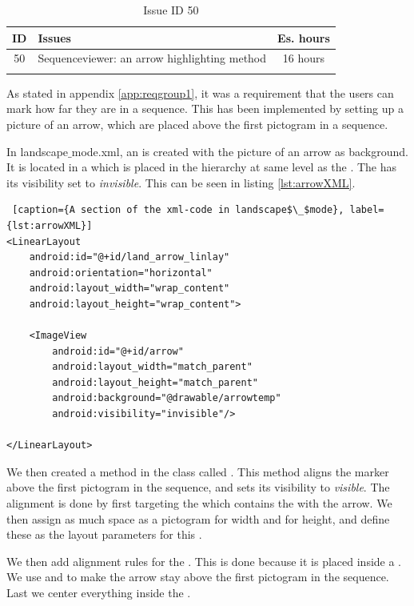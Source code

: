 \begin{longtable} { | c | p{12cm} | c | } 
\hline
	ID 	&	Issues	&		 Es. hours \\\hline
	50 	&	Sequenceviewer: an arrow highlighting method	&	16 hours \\\hline
\caption{Issue ID 50}
\label{tab:spr3_SVarrowhighlight}
\end{longtable}

As stated in appendix \ref{app:reqgroup1}, it was a requirement that the users can mark how far they are in a sequence. This has been implemented by setting up a picture of an arrow, which are placed above the first pictogram in a sequence.

In landscape$\_$mode.xml, an  is created with the picture of an arrow as background. It is located in a  which is placed in the hierarchy at same level as the . The  has its visibility set to \textit{invisible}. This can be seen in listing \ref{lst:arrowXML}.

\begin{lstlisting} [caption={A section of the xml-code in landscape$\_$mode}, label={lst:arrowXML}]
<LinearLayout
    android:id="@+id/land_arrow_linlay"
    android:orientation="horizontal"
    android:layout_width="wrap_content"
    android:layout_height="wrap_content">

    <ImageView
        android:id="@+id/arrow"
        android:layout_width="match_parent"
        android:layout_height="match_parent"
        android:background="@drawable/arrowtemp"
        android:visibility="invisible"/>
                
</LinearLayout>
\end{lstlisting}

We then created a method in the  class called . This method aligns the marker above the first pictogram in the sequence, and sets its visibility to \textit{visible}. The alignment is done by first targeting the  which contains the  with the arrow. We then assign as much space as a pictogram for width and  for height, and define these as the layout parameters for this .

We then add alignment rules for the . This is done because it is placed inside a . We use  and \newline {} to make the arrow stay above the first pictogram in the sequence. Last we center everything inside the .

